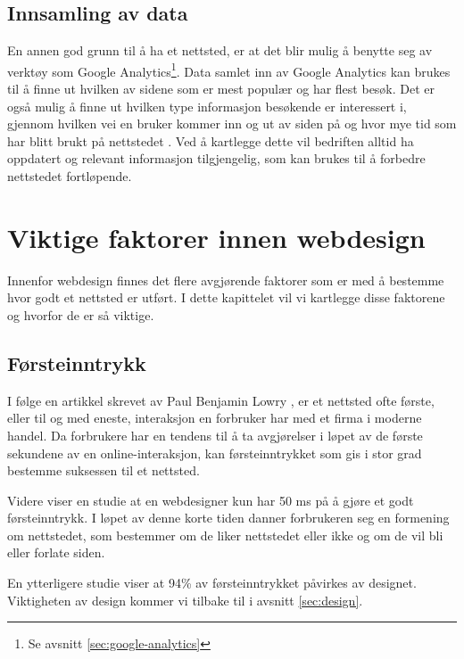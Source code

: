 \subsection{Innsamling av data}
En annen god grunn til å ha et nettsted, er at det blir mulig å benytte seg av verktøy som Google Analytics\footnote{Se avsnitt \ref{sec:google-analytics}}. Data samlet inn av Google Analytics kan brukes til å finne ut hvilken av sidene som er mest populær og har flest besøk. Det er også mulig å finne ut hvilken type informasjon besøkende er interessert i, gjennom hvilken vei en bruker kommer inn og ut av siden på og hvor mye tid som har blitt brukt på nettstedet \cite{kent2011lwa}. Ved å kartlegge dette vil bedriften alltid ha oppdatert og relevant informasjon tilgjengelig, som kan brukes til å forbedre nettstedet fortløpende. 



\section{Viktige faktorer innen webdesign}
\label{sec:viktige-faktorer}
Innenfor webdesign finnes det flere avgjørende faktorer som er med å bestemme hvor godt et nettsted er utført. I dette kapittelet vil vi kartlegge disse faktorene og hvorfor de er så viktige.


\subsection{Førsteinntrykk}
I følge en artikkel skrevet av Paul Benjamin Lowry \cite{lowry2014pis}, er et nettsted ofte første, eller til og med eneste, interaksjon en forbruker har med et firma i moderne handel. Da forbrukere har en tendens til å ta avgjørelser i løpet av de første sekundene av en online-interaksjon, kan førsteinntrykket som gis i stor grad bestemme suksessen til et nettsted. 

Videre viser en studie \cite{lindgaard2006awd} at en webdesigner kun har 50 ms på å gjøre et godt førsteinntrykk.
I løpet av denne korte tiden danner forbrukeren seg en formening om nettstedet, som bestemmer om de liker nettstedet eller ikke og om de vil bli eller forlate siden.

En ytterligere studie \cite{sillence2004tam} viser at 94\% av førsteinntrykket påvirkes av designet.
Viktigheten av design kommer vi tilbake til i avsnitt \ref{sec:design}.

